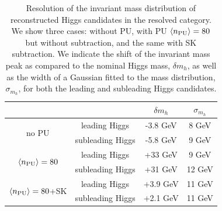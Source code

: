     \begin{table}[h]
      \centering
      \begin{tabular}{|c|c|c|c|}
        \hline
        &   &   $\delta m_h$  &  $\sigma_{m_h}$  \\
        \hline
        \hline
        \multirow{2}{*}{no PU}  & leading Higgs  &  -3.8 GeV   & 8 GeV   \\
          & subleading Higgs   & -5.8 GeV  &  9 GeV \\
        \hline
          \multirow{2}{*}{$\left\langle n_{\rm PU}\right\rangle=80$}  & leading Higgs  &  +33 GeV   & 9 GeV   \\
          & subleading Higgs   & +31 GeV  &  12 GeV \\
          \hline
            \multirow{2}{*}{$\left\langle n_{\rm PU}\right\rangle=80$+SK}  & leading Higgs  &  +3.9 GeV   & 11 GeV   \\
          & subleading Higgs   & +2.1 GeV  &  11 GeV \\
        \hline
        \end{tabular}
      \caption{\label{tab:massresolution}
        Resolution of the invariant mass distribution of
        reconstructed Higgs candidates in the resolved
        category.
        We show three cases: without PU, with PU $\left\langle n_{\rm PU}\right\rangle=80$
        but without subtraction, and the same with SK subtraction.
        We indicate the shift of the invariant mass peak as compared
        to the nominal Higgs mass, $\delta m_h$, as well as the width
        of a Gaussian fitted to the mass distribution, $\sigma_{m_h}$,
        for both the leading and subleading Higgs candidates.
      }
      \end{table}






